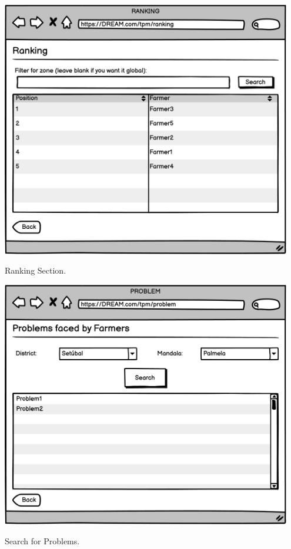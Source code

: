 \vspace{0.5cm}
\begin{minipage}{.5\textwidth}
	\centering
	\includegraphics[width=0.95\textwidth]{Images/Mockup/TPM/03TPMRanking.png}
	\captionsetup{type=figure}
	\caption{Ranking Section.}
\end{minipage}%
\begin{minipage}{.5\textwidth}
	\centering
	\includegraphics[width=0.95\textwidth]{Images/Mockup/TPM/04TPMProblem.png}
	\captionsetup{type=figure}
	\caption{Search for Problems.}
\end{minipage}
